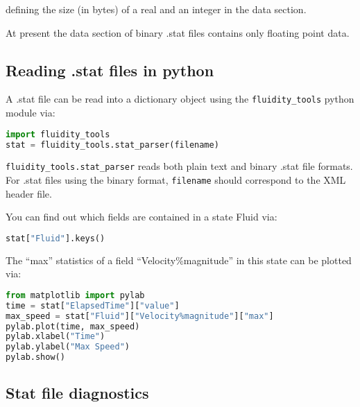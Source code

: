 defining the size (in bytes) of a real and an integer in the data section.

At present the data section of binary .stat files contains only floating point
data.

\subsection{Reading .stat files in python}
\label{sec:diagnostics_stat_parser}

A .stat file can be read into a dictionary object using the
\lstinline[language = Python]*fluidity_tools* python module via:

\begin{lstlisting}[language = Python]
import fluidity_tools
stat = fluidity_tools.stat_parser(filename)
\end{lstlisting}

\lstinline[language = Python]*fluidity_tools.stat_parser* reads both
plain text and binary .stat file formats. For .stat files using the binary
format, \lstinline[language = Python]*filename* should correspond to the XML
header file.

You can find out which fields are contained in a state Fluid via:

\begin{lstlisting}[language=Python]
stat["Fluid"].keys()
\end{lstlisting}

The ``max'' statistics of a field ``Velocity\%magnitude'' in this state can be
plotted via:

\begin{lstlisting}[language=Python]
from matplotlib import pylab
time = stat["ElapsedTime"]["value"]
max_speed = stat["Fluid"]["Velocity%magnitude"]["max"]
pylab.plot(time, max_speed)
pylab.xlabel("Time")
pylab.ylabel("Max Speed")
pylab.show()
\end{lstlisting}


\subsection{Stat file diagnostics}
\label{sec:stat_diagnostics}


